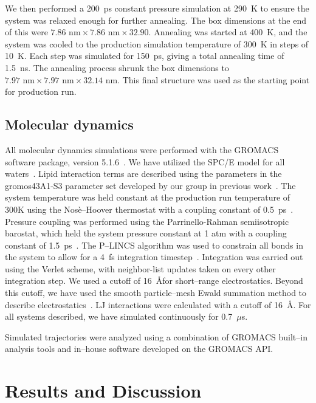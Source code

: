 \documentclass[12pt,openany,final]{book}
\begin{document}
We then performed a 200~ps constant pressure simulation at 290~K to
ensure the system was relaxed enough for further annealing. 
The box dimensions at the end of this were $7.86\text{~nm}\times7.86\text{~nm}\times32.90$.
Annealing was started at 400~K, and the system was cooled to the production
simulation temperature of 300~K in steps of 10~K. 
Each step was simulated for 150~ps, giving a total annealing time of 1.5~ns. 
The annealing process shrunk the box dimensions to $7.97\text{~nm}\times7.97\text{~nm}\times32.14\text{~nm}$.
This final structure 
was used as the starting point for production run.

\subsection{Molecular dynamics}

All molecular dynamics simulations were performed with the GROMACS software package, 
version 5.1.6~\cite{abraham:2015,pall:2014,van:2005,lindahl:2001,berendsen:1995}.
We have utilized the SPC/E model for all waters~\cite{spce}. Lipid interaction
terms are described using the parameters in the gromos43A1-S3
parameter set developed by our group in previous work~\cite{chiu:2009}. 
The system temperature was held constant at the production run 
temperature of 300K using the Nos\`e--Hoover thermostat
with a coupling constant of 0.5~ps~\cite{nose:1983}. 
Pressure coupling was performed using the Parrinello-Rahman semiisotropic barostat,
which held the system pressure constant at 1 atm with a coupling
constant of 1.5~ps~\cite{parrinello:1981}. 
The P--LINCS algorithm was used to constrain all bonds in the system to allow for a 4~fs
integration timestep~\cite{lincs}. 
Integration was carried out using the Verlet scheme, 
with neighbor-list updates taken on every other integration step. 
We used a cutoff of 16~\AA for short--range electrostatics. 
Beyond this cutoff, we have used the smooth particle--mesh 
Ewald summation method to describe electrostatics~\cite{essmann:1995}. 
LJ interactions were calculated with a cutoff of 16~\AA. 
For all systems described, we have simulated continuously for 0.7~$\mu$s.

Simulated trajectories were analyzed using a combination of GROMACS
built--in analysis tools and in--house software developed on the
GROMACS API.

\section{Results and Discussion}
\end{document}

